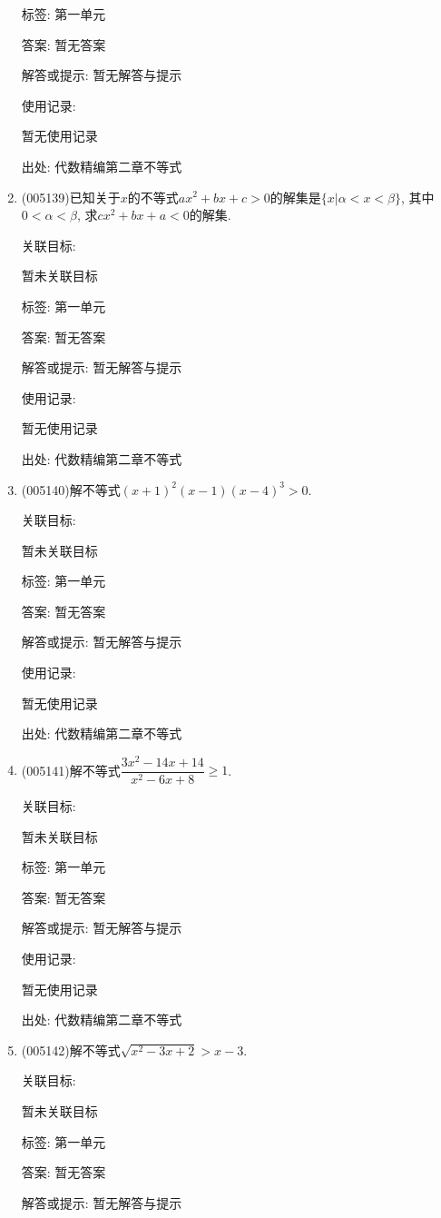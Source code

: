 \documentclass[10pt,a4paper]{article}
\begin{document}
\begin{enumerate}[1.]
标签: 第一单元

答案: 暂无答案

解答或提示: 暂无解答与提示

使用记录:

暂无使用记录


出处: 代数精编第二章不等式
\item { (005139)}已知关于$x$的不等式$ax^2+bx+c>0$的解集是$\{x|\alpha<x<\beta\}$, 其中$0<\alpha<\beta$, 求$cx^2+bx+a<0$的解集.


关联目标:

暂未关联目标



标签: 第一单元

答案: 暂无答案

解答或提示: 暂无解答与提示

使用记录:

暂无使用记录


出处: 代数精编第二章不等式
\item { (005140)}解不等式$(x+1)^2(x-1)(x-4)^3>0$.


关联目标:

暂未关联目标



标签: 第一单元

答案: 暂无答案

解答或提示: 暂无解答与提示

使用记录:

暂无使用记录


出处: 代数精编第二章不等式
\item { (005141)}解不等式$\dfrac{3x^2-14x+14}{x^2-6x+8}\ge 1$.


关联目标:

暂未关联目标



标签: 第一单元

答案: 暂无答案

解答或提示: 暂无解答与提示

使用记录:

暂无使用记录


出处: 代数精编第二章不等式
\item { (005142)}解不等式$\sqrt{x^2-3x+2}>x-3$.


关联目标:

暂未关联目标



标签: 第一单元

答案: 暂无答案

解答或提示: 暂无解答与提示


\end{enumerate}
\end{document}
